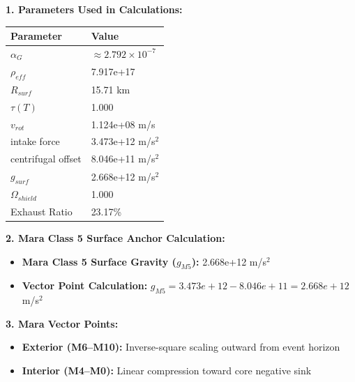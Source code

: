 \documentclass[11pt, a4paper]{article}
\begin{document}
\vspace{0.5em}
\noindent \textbf{1. Parameters Used in Calculations:}
\begin{center}
  \begin{tabular}{|l|l|}
    \hline
    \textbf{Parameter} & \textbf{Value} \\ \hline
    $\alpha_G$ & $\approx 2.792 \times 10^{-7}$ \\ \hline
    $\rho_{eff}$ & 7.917e+17 \\ \hline
    $R_{surf}$ & 15.71 km \\ \hline
    $\tau(T)$ & 1.000 \\ \hline
    $v_{rot}$ & 1.124e+08 m/s \\ \hline
    intake force & 3.473e+12 m/s$^2$ \\ \hline
    centrifugal offset & 8.046e+11 m/s$^2$ \\ \hline
    $g_{surf}$ & 2.668e+12 m/s$^2$ \\ \hline
    $\Omega_{shield}$ & 1.000 \\ \hline
    Exhaust Ratio & 23.17\% \\ \hline
  \end{tabular}
\end{center}

\vspace{0.5em}
\noindent \textbf{2. Mara Class 5 Surface Anchor Calculation:}
\begin{itemize}
  \item \textbf{Mara Class 5 Surface Gravity ($g_{M5}$):} 2.668e+12 m/s$^2$
  \item \textbf{Vector Point Calculation:} $g_{M5} = 3.473e+12 - 8.046e+11 = 2.668e+12$ m/s$^2$
\end{itemize}

\vspace{0.5em}
\noindent \textbf{3. Mara Vector Points:}
\begin{itemize}
  \item \textbf{Exterior (M6--M10):} Inverse-square scaling outward from event horizon
  \item \textbf{Interior (M4--M0):} Linear compression toward core negative sink
\end{itemize}
\end{document}
